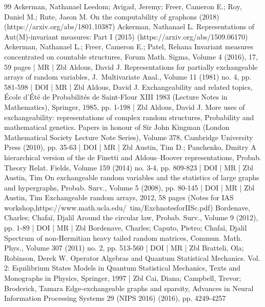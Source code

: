 \begin{thebibliography}{99}
Ackerman, Nathanael Leedom; Avigad, Jeremy; Freer, Cameron E.; Roy, Daniel M.; Rute, Jason M. On the computability of graphons (2018) (https://arxiv.org/abs/1801.10387)
Ackerman, Nathanael L. Representations of Aut(M)-invariant measures: Part I (2015) (https://arxiv.org/abs/1509.06170)
Ackerman, Nathanael L.; Freer, Cameron E.; Patel, Rehana Invariant measures concentrated on countable structures, Forum Math. Sigma, Volume 4 (2016), 17, 59 pages | MR | Zbl
Aldous, David J. Representations for partially exchangeable arrays of random variables, J. Multivariate Anal., Volume 11 (1981) no. 4, pp. 581-598 | DOI | MR | Zbl
Aldous, David J. Exchangeability and related topics, École d’Été de Probabilités de Saint-Flour XIII 1983 (Lecture Notes in Mathematics), Springer, 1985, pp. 1-198 | Zbl
Aldous, David J. More uses of exchangeability: representations of complex random structures, Probability and mathematical genetics. Papers in honour of Sir John Kingman (London Mathematical Society Lecture Note Series), Volume 378, Cambridge University Press (2010), pp. 35-63 | DOI | MR | Zbl
Austin, Tim D.; Panchenko, Dmitry A hierarchical version of the de Finetti and Aldous–Hoover representations, Probab. Theory Relat. Fields, Volume 159 (2014) no. 3-4, pp. 809-823 | DOI | MR | Zbl
Austin, Tim On exchangeable random variables and the statistics of large graphs and hypergraphs, Probab. Surv., Volume 5 (2008), pp. 80-145 | DOI | MR | Zbl
Austin, Tim Exchangeable random arrays, 2012, 58 pages (Notes for IAS workshop,https://www.math.ucla.edu/~tim/ExchnotesforIISc.pdf)
Bordenave, Charles; Chafaï, Djalil Around the circular law, Probab. Surv., Volume 9 (2012), pp. 1-89 | DOI | MR | Zbl
Bordenave, Charles; Caputo, Pietro; Chafaï, Djalil Spectrum of non-Hermitian heavy tailed random matrices, Commun. Math. Phys., Volume 307 (2011) no. 2, pp. 513-560 | DOI | MR | Zbl
Bratteli, Ola; Robinson, Derek W. Operator Algebras and Quantum Statistical Mechanics. Vol. 2: Equilibrium States Models in Quantum Statistical Mechanics, Texts and Monographs in Physics, Springer, 1997 | Zbl
Cai, Diana; Campbell, Trevor; Broderick, Tamara Edge-exchangeable graphs and sparsity, Advances in Neural Information Processing Systems 29 (NIPS 2016) (2016), pp. 4249-4257

\end{thebibliography}
